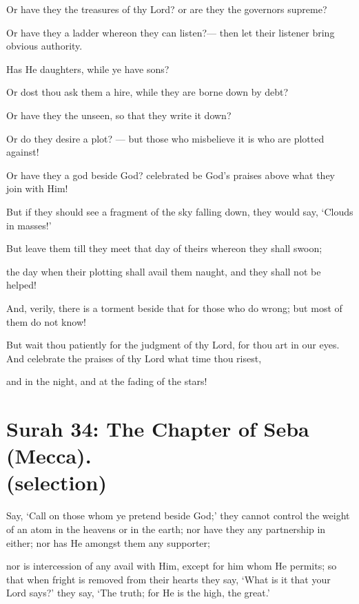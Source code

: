 \documentclass[fontsize=14pt, letterpaper, notitlepage, openany, DIV=12]{scrbook} %
\begin{document}
\noindent[52:37]
Or have they the treasures of thy Lord? or are they the governors supreme?

\noindent[52:38]
Or have they a ladder whereon they can listen?--- then let their listener bring obvious
authority.

\noindent[52:39]
Has He daughters, while ye have sons?

\noindent[52:40]
Or dost thou ask them a hire, while they are borne down by debt?

\noindent[52:41]
Or have they the unseen, so that they write it down?

\noindent[52:42]
Or do they desire a plot? --- but those who misbelieve it is who are plotted against!

\noindent[52:43]
Or have they a god beside God? celebrated be God's praises above what they join with
Him!

\noindent[52:44]
But if they should see a fragment of the sky falling down, they would say, `Clouds in
masses!'

\noindent[52:45]
But leave them till they meet that day of theirs whereon they shall swoon;

\noindent[52:46]
the day when their plotting shall avail them naught, and they shall not be helped!

\noindent[52:47]
And, verily, there is a torment beside that for those who do wrong; but most of them do
not know!

\noindent[52:48]
But wait thou patiently for the judgment of thy Lord, for thou art in our eyes. And
celebrate the praises of thy Lord what time thou risest,

\noindent[52:49]
and in the night, and at the fading of the stars!


\section[Surah 34: The Chapter of Seba (Mecca).]{Surah 34: The Chapter of Seba (Mecca).\\ (selection)}


\noindent[34:22]
Say, `Call on those whom ye pretend beside God;' they cannot control the weight of an
atom in the heavens or in the earth; nor have they any partnership in either; nor has He amongst
them any supporter;

\noindent[34:23]
nor is intercession of any avail with Him, except for him whom He permits; so that when
fright is removed from their hearts they say, `What is it that your Lord says?' they say, `The
truth; for He is the high, the great.'
\end{document}
